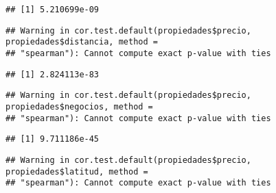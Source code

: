 \documentclass[
]{article}
\newenvironment{Shaded}{\begin{snugshade}}{\end{snugshade}}
\newcommand{\AttributeTok}[1]{\textcolor[rgb]{0.77,0.63,0.00}{#1}}
\newcommand{\FunctionTok}[1]{\textcolor[rgb]{0.00,0.00,0.00}{#1}}
\newcommand{\NormalTok}[1]{#1}
\newcommand{\SpecialCharTok}[1]{\textcolor[rgb]{0.00,0.00,0.00}{#1}}
\newcommand{\StringTok}[1]{\textcolor[rgb]{0.31,0.60,0.02}{#1}}
\begin{document}
\begin{verbatim}
## [1] 5.210699e-09
\end{verbatim}

\begin{Shaded}
\end{Shaded}

\begin{verbatim}
## Warning in cor.test.default(propiedades$precio, propiedades$distancia, method =
## "spearman"): Cannot compute exact p-value with ties
\end{verbatim}

\begin{verbatim}
## [1] 2.824113e-83
\end{verbatim}

\begin{Shaded}
\end{Shaded}

\begin{verbatim}
## Warning in cor.test.default(propiedades$precio, propiedades$negocios, method =
## "spearman"): Cannot compute exact p-value with ties
\end{verbatim}

\begin{verbatim}
## [1] 9.711186e-45
\end{verbatim}

\begin{Shaded}
\end{Shaded}

\begin{verbatim}
## Warning in cor.test.default(propiedades$precio, propiedades$latitud, method =
## "spearman"): Cannot compute exact p-value with ties
\end{verbatim}
\end{document}
